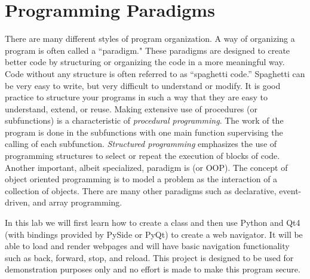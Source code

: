 \label{lab:OOP}

\section*{Programming Paradigms}
There are many different styles of program organization.
A way of organizing a program is often called a ``paradigm."
These paradigms are designed to create better code by structuring or organizing the code in a more meaningful way.
Code without any structure is often referred to as ``spaghetti code.''
Spaghetti can be very easy to write, but very difficult to understand or modify.
It is good practice to structure your programs in such a way that they are easy to understand, extend, or reuse.
Making extensive use of procedures (or subfunctions) is a characteristic of \emph{procedural programming}.
The work of the program is done in the subfunctions with one main function supervising the calling of each subfunction.
\emph{Structured programming} emphasizes the use of programming structures to select or repeat the execution of blocks of code.
Another important, albeit specialized, paradigm is  (or OOP).
The concept of object oriented programming is to model a problem as the interaction of a collection of objects.
There are many other paradigms such as declarative, event-driven, and array programming.

In this lab we will first learn how to create a class and then use Python and Qt4 (with bindings provided by PySide or PyQt) to create a web navigator.
It will be able to load and render webpages and will have basic navigation functionality such as back, forward, stop, and reload.
This project is designed to be used for demonstration purposes only and no effort is made to make this program secure.

